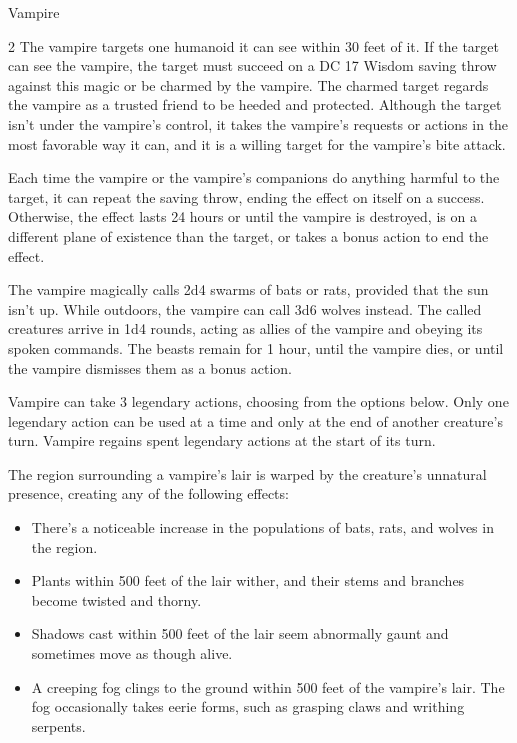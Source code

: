 \documentclass[10pt,a4paper,twoside,bg=print,twocolumn,openany,nodeprecatedcode]{dndbook}
\begin{document}
\begin{DndMonster}[float*=b,width=\textwidth + 8pt]{Vampire}
\begin{multicols}{2}
The vampire targets one humanoid it can see within 30 feet of it. If the target can see the vampire, the target must succeed on a DC 17 Wisdom saving throw against this magic or be charmed by the vampire. The charmed target regards the vampire as a trusted friend to be heeded and protected. Although the target isn't under the vampire's control, it takes the vampire's requests or actions in the most favorable way it can, and it is a willing target for the vampire's bite attack.

Each time the vampire or the vampire's companions do anything harmful to the target, it can repeat the saving throw, ending the effect on itself on a success. Otherwise, the effect lasts 24 hours or until the vampire is destroyed, is on a different plane of existence than the target, or takes a bonus action to end the effect.

The vampire magically calls 2d4 swarms of bats or rats, provided that the sun isn't up. While outdoors, the vampire can call 3d6 wolves instead. The called creatures arrive in 1d4 rounds, acting as allies of the vampire and obeying its spoken commands. The beasts remain for 1 hour, until the vampire dies, or until the vampire dismisses them as a bonus action.

Vampire can take 3 legendary actions, choosing from the options below. Only one legendary action can be used at a time and only at the end of another creature's turn. Vampire regains spent legendary actions at the start of its turn.

\begin{DndMonsterLegendaryActions}
\end{DndMonsterLegendaryActions}
The region surrounding a vampire's lair is warped by the creature's unnatural presence, creating any of the following effects:


\begin{itemize}
\item There's a noticeable increase in the populations of bats, rats, and wolves in the region.
\item Plants within 500 feet of the lair wither, and their stems and branches become twisted and thorny.
\item Shadows cast within 500 feet of the lair seem abnormally gaunt and sometimes move as though alive.
\item A creeping fog clings to the ground within 500 feet of the vampire's lair. The fog occasionally takes eerie forms, such as grasping claws and writhing serpents.
\end{itemize}


\end{multicols}
\end{DndMonster}
\end{document}
